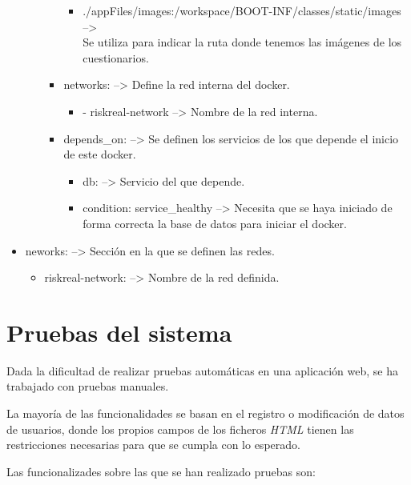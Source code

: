 \begin{itemize}
\begin{itemize}
\begin{itemize}
\begin{itemize}
				\item ./appFiles/images:/workspace/BOOT-INF/classes/static/images --> \\Se utiliza para indicar la ruta donde tenemos las imágenes de los cuestionarios.
			\end{itemize}
			\item networks: --> Define la red interna del docker.
			\begin{itemize}
				\item - riskreal-network --> Nombre de la red interna.
			\end{itemize}
			\item depends\_on: --> Se definen los servicios de los que depende el inicio de este docker.
			\begin{itemize}
				\item db: --> Servicio del que depende.
				\item condition: service\_healthy --> Necesita que se haya iniciado de forma correcta la base de datos para iniciar el docker.
			\end{itemize}
		\end{itemize}
	\end{itemize}
	\item neworks: --> Sección en la que se definen las redes.
	\begin{itemize}
		\item riskreal-network: --> Nombre de la red definida.
	\end{itemize}
\end{itemize}

\section{Pruebas del sistema}

Dada la dificultad de realizar pruebas automáticas en una aplicación web, se ha trabajado con pruebas manuales.

La mayoría de las funcionalidades se basan en el registro o modificación de datos de usuarios, donde los propios campos de los ficheros \textit{HTML} tienen las restricciones necesarias para que se cumpla con lo esperado.

Las funcionalizades sobre las que se han realizado pruebas son:


